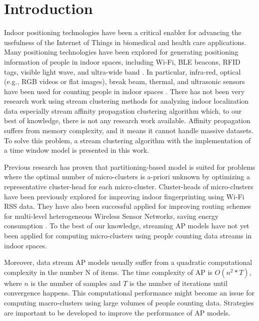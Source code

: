 \documentclass[../UNBThesis2.tex]{subfiles}
\begin{document}
\chapter{Introduction}



Indoor positioning technologies have been a critical enabler for advancing the usefulness of the Internet of Things in biomedical and health care applications. Many positioning technologies have been explored for generating positioning information of people in indoor spaces, including Wi-Fi, BLE beacons, RFID tags, visible light wave, and ultra-wide band \cite{namiot2015indoor, jeon2018ble}. In particular, infra-red, optical (e.g., RGB videos or flat images), break beam, thermal, and ultrasonic sensors have been used for counting people in indoor spaces \cite{mautz2012indoor}. There has not been very research work using stream clustering methods for analyzing indoor localization data especially stream affinity propagation clustering algorithm \cite{dueck2009affinity} which, to our best of knowledge, there is not any research work available. Affinity propagation suffers from memory complexity, and it means it cannot handle massive datasets. To solve this problem, a stream clustering algorithm with the implementation of a time window model is presented in this work. 


Previous research has proven that partitioning-based model is suited for problems where the optimal number of micro-clusters is a-priori unknown by optimizing a representative cluster-head for each micro-cluster. Cluster-heads of micro-clusters have been previously explored for improving indoor fingerprinting using Wi-Fi RSS data\cite{hu2015improving, subedi2019improving}. They have also been successful applied for improving routing schemes for multi-level heterogeneous Wireless Sensor Networks, saving energy consumption \cite{wang2019affinity}. To the best of our knowledge,  streaming AP models have not yet been applied for computing micro-clusters using people counting data streams in indoor spaces.  

Moreover, data stream AP models usually suffer from a quadratic computational complexity in the number N of items. The time complexity of AP is $O(n^2*T)$, where $n$ is the number of samples and $T$ is the number of iterations until convergence happens\cite{refianti2017time}. This computational performance might become an issue for computing macro-clusters using large volumes of people counting data. Strategies are important to be developed to improve the performance of AP models. 
\end{document}
